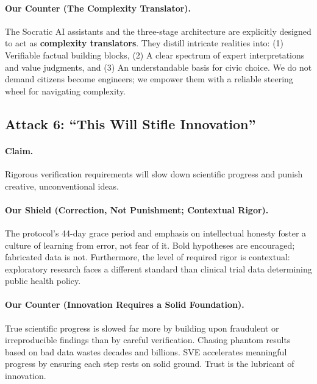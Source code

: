 \documentclass[11pt,a4paper]{article}
\theoremstyle{definition}
\theoremstyle{remark}
\begin{document}
\begin{small}
\begin{enumerate}
\begin{protocol}
\paragraph{\textbf{Our Counter (The Complexity Translator).}} The Socratic AI assistants and the three-stage architecture are explicitly designed to act as \textbf{complexity translators}. They distill intricate realities into: (1) Verifiable factual building blocks, (2) A clear spectrum of expert interpretations and value judgments, and (3) An understandable basis for civic choice. We do not demand citizens become engineers; we empower them with a reliable steering wheel for navigating complexity.

\vspace{1em}

\subsection*{\textcolor{accentcolor}{Attack 6: ``This Will Stifle Innovation''}}

\paragraph{\textbf{Claim.}} Rigorous verification requirements will slow down scientific progress and punish creative, unconventional ideas.

\paragraph{\textbf{Our Shield (Correction, Not Punishment; Contextual Rigor).}} The protocol's 44-day grace period and emphasis on intellectual honesty foster a culture of learning from error, not fear of it. Bold hypotheses are encouraged; fabricated data is not. Furthermore, the level of required rigor is contextual: exploratory research faces a different standard than clinical trial data determining public health policy.

\paragraph{\textbf{Our Counter (Innovation Requires a Solid Foundation).}} True scientific progress is slowed far more by building upon fraudulent or irreproducible findings than by careful verification. Chasing phantom results based on bad data wastes decades and billions. SVE accelerates meaningful progress by ensuring each step rests on solid ground. Trust is the lubricant of innovation.


\end{protocol}
\end{enumerate}
\end{small}
\end{document}
